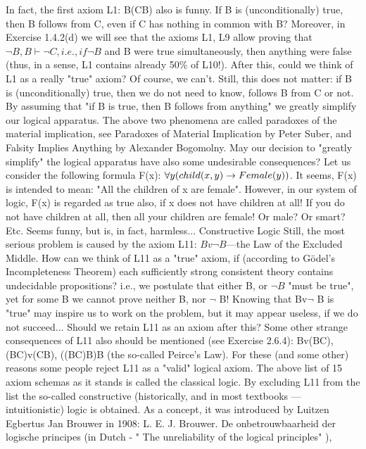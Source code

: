 In fact, the first axiom L1: B\IMPLIES (C\IMPLIES B) also is funny. If B is (unconditionally) true, then B follows from C,
even if C has nothing in common with B? Moreover, in Exercise 1.4.2(d) we will see that the axioms L1,
L9 allow proving that \(\neg B, B \vdash \neg C, i.e., if \neg B\) and B were true simultaneously, then anything were false
(thus, in a sense, L1 contains already 50\% of L10!). After this, could we think of L1 as a really "true"
axiom? Of course, we can't. Still, this does not matter: if B is (unconditionally) true, then we do not need
to know, follows B from C or not. By assuming that "if B is true, then B follows from anything" we
greatly simplify our logical apparatus.
The above two phenomena are called paradoxes of the material implication, see Paradoxes of Material
Implication by Peter Suber, and Falsity Implies Anything by Alexander Bogomolny.
May our decision to "greatly simplify" the logical apparatus have also some undesirable consequences?
Let us consider the following formula F(x): \(\forall y(child(x, y)\rightarrow Female(y))\).
It seems, F(x) is intended to mean: "All the children of x are female". However, in our system of logic, F(x) is regarded as true also, if
x does not have children at all! If you do not have children at all, then all your children are female! Or
male? Or smart? Etc. Seems funny, but is, in fact, harmless...
Constructive Logic
Still, the most serious problem is caused by the axiom L11: \(Bv\neg B\)---the Law of the Excluded Middle.
How can we think of L11 as a "true" axiom, if (according to G\"{o}del's Incompleteness Theorem) each sufficiently strong consistent theory contains undecidable propositions? i.e., we postulate that either B, or
\(\neg B\) "must be true", yet for some B we cannot prove neither B, nor \(\neg\) B! Knowing that Bv\(\neg\) B is "true" may
inspire us to work on the problem, but it may appear useless, if we do not succeed... Should we retain L11
as an axiom after this?
Some other strange consequences of L11 also should be mentioned (see Exercise 2.6.4):
Bv(B\IMPLIES C),
(B\IMPLIES C)v(C\IMPLIES B),
((B\IMPLIES C)\IMPLIES B)\IMPLIES B (the so-called Peirce's Law).
For these (and some other) reasons some people reject L11 as a "valid" logical axiom.
The above list of 15 axiom schemas as it stands is called the classical logic.
By excluding L11 from the list the so-called constructive (historically, and in most textbooks ---
intuitionistic) logic is obtained. As a concept, it was introduced by Luitzen Egbertus Jan Brouwer in
1908:
L. E. J. Brouwer. De onbetrouwbaarheid der logische principes (in Dutch - " The unreliability of the logical principles" ),
